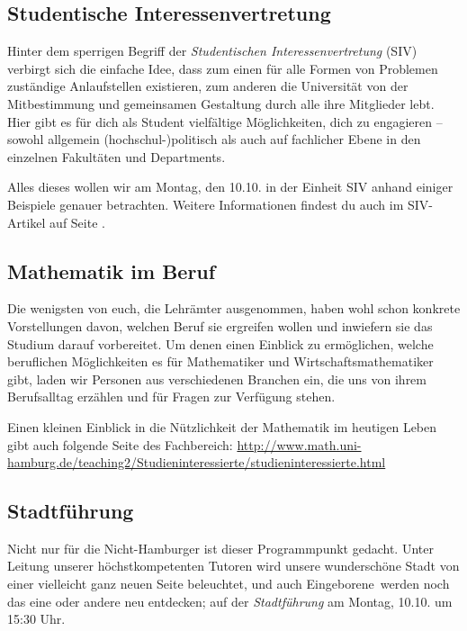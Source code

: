 \subsection*{Studentische Interessenvertretung}

Hinter dem sperrigen Begriff der \emph{Studentischen Interessenvertretung}
(SIV) verbirgt sich die einfache Idee, dass zum einen für alle Formen von
Problemen zuständige Anlaufstellen existieren, zum anderen die Universität von
der Mitbestimmung und gemeinsamen Gestaltung durch alle ihre Mitglieder lebt.
Hier gibt es für dich als Student vielfältige Möglichkeiten, dich zu engagieren
-- sowohl allgemein (hochschul-)politisch als auch auf fachlicher Ebene in den
einzelnen Fakultäten und Departments.


Alles dieses wollen wir am Montag, den 10.10. in der Einheit SIV anhand einiger
Beispiele genauer betrachten. Weitere Informationen findest du auch im
SIV-Artikel auf Seite \pageref{page:siv}.

\subsection*{Mathematik im Beruf}

Die wenigsten von euch, die Lehrämter ausgenommen, haben wohl schon konkrete
Vorstellungen davon, welchen Beruf sie ergreifen wollen und inwiefern sie das
Studium darauf vorbereitet. Um denen einen Einblick zu ermöglichen, welche
beruflichen Möglichkeiten es für Mathematiker und Wirtschaftsmathematiker gibt,
laden wir Personen aus verschiedenen Branchen ein, die uns von ihrem
Berufsalltag erzählen und für Fragen zur Verfügung stehen.

Einen kleinen Einblick in die Nützlichkeit der Mathematik im heutigen Leben
gibt auch folgende Seite des Fachbereich:
\url{http://www.math.uni-hamburg.de/teaching2/Studieninteressierte/studieninteressierte.html}

\subsection*{Stadtführung}


Nicht nur für die Nicht-Hamburger ist dieser Programmpunkt gedacht.  Unter
Leitung unserer höchstkompetenten Tutoren wird unsere wunderschöne Stadt von
einer vielleicht ganz neuen Seite beleuchtet, und auch \glqq Eingeborene\grqq\
werden noch das eine oder andere neu entdecken; auf der \emph{Stadtführung} am
Montag, 10.10. um 15:30 Uhr.

